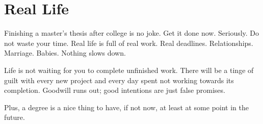 \chapter{Real Life}
\label{get_it_done}

Finishing a master's thesis after college is no joke.
Get it done now. Seriously.
Do not waste your time.
Real life is full of real work. Real deadlines.
Relationships. Marriage. Babies. Nothing slows down.

Life is not waiting for you to complete unfinished work.
There will be a tinge of guilt with every new project and every day spent not working towards its completion.
Goodwill runs out; good intentions are just false promises.

Plus, a degree is a nice thing to have, if not now, at least at some point in the future.

